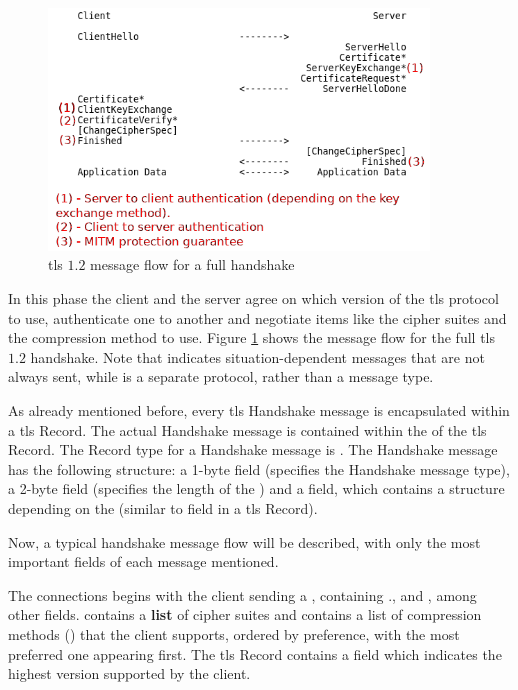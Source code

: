 \documentclass{llncs}
\begin{document}
\begin{figure}
\centering
\includegraphics[width=0.9\textwidth]{img/tls-12-full-handshake2.png}
\caption{\label{fig:tls-12-handshake} \gls{tls} $1.2$ message flow for a full handshake}
\end{figure}


In this phase the client and the server agree on which version of the \gls{tls}
protocol to use, authenticate one to another and negotiate items like
the cipher suites and the compression method to use. Figure \ref{fig:tls-12-handshake} shows the message flow for the
full \gls{tls} $1.2$ handshake. Note that \codeword{*} indicates situation-dependent
messages that are not always sent, while  is a separate
protocol, rather than a message type.

As already mentioned before, every \gls{tls} Handshake message is encapsulated within
a \gls{tls} Record. The actual Handshake message is contained within the
 of the \gls{tls} Record. The Record type for a Handshake
message is . The Handshake message has the following structure:
a 1-byte  field (specifies the Handshake message type),
a 2-byte  field (specifies the length of the )
and a  field, which contains a structure depending on the
 (similar to  field in a \gls{tls} Record).

Now, a typical handshake message flow will be described, with only the most important fields of each message mentioned.

The connections begins with the client sending a , containing
.,  and ,
among other fields.
 contains a \textbf{list} of cipher suites and 
contains a list of compression methods () that the
client supports, ordered by preference, with the most preferred one appearing first.
The \gls{tls} Record contains a   field which
indicates the highest version supported by the client.
\end{document}
